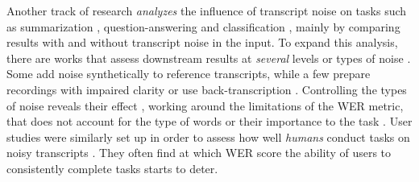 Another track of research \textit{analyzes} the influence of transcript noise on tasks such as summarization \citep{Szaszak2016noiseSumm, Tundik2019noiseSLU, Chowdhury2024noiseeffect}, question-answering \citep{lee2018spokenSquad, You2021noiseQA} and classification \citep{shon2022slue, Pentland2023socialscience}, mainly by comparing results with and without transcript noise in the input.
To expand this analysis, there are works that assess downstream results at \textit{several} levels or types of noise \citep{zechner-waibel-2000-minimizing, Agarwal2007noise, gopalakrishnan2020dialog, feng2022asrglue, shon-etal-2023-slue, Li2024dementia}. Some add noise synthetically to reference transcripts, while a few prepare recordings with impaired clarity \citep{feng2022asrglue} or use back-transcription \citep{kubis-etal-2023-back}.
Controlling the types of noise reveals their effect \citep{balagopalan-etal-2020-impact, min-etal-2021-evaluating}, working around the limitations of the WER metric, that does not account for the type of words or their importance to the task \citep{wang2003indicator}.
User studies were similarly set up in order to assess how well \textit{humans} conduct tasks on noisy transcripts \citep{stark2000speechretrieval, sanders2002effect, munteanu2006acceptable, favre2013performance}.
They often find at which WER score the ability of users to consistently complete tasks starts to deter.

